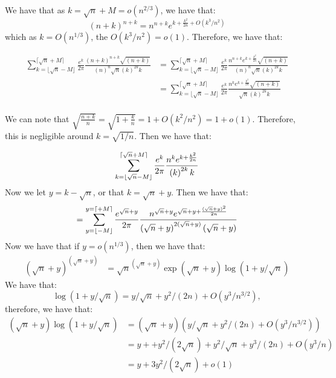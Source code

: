 \documentclass[]{article}
\begin{document}
We have that as $k = \sqrt{n} + M = o(n^{2/3})$, we have that:
\begin{equation}
	\left(n + k\right)^{n + k} = n^{n + k} e^{k + \frac{k^2}{2n} + O(k^3/n^2)}
\end{equation}
which as $k = O(n^{1/3})$, the $O(k^3/n^2) = o(1)$. Therefore, we have that:

\begin{align*}
	\sum_{k = \lfloor \sqrt{n} - M \rfloor }^{ \lceil \sqrt{n} + M \rceil} \frac{e^{k}}{2\pi} \frac{\left(n + k\right)^{n + k}\sqrt{(n + k)}}{\left(n\right)^n \sqrt{n} \left(k\right)^{2k}k } &= 
	\sum_{k = \lfloor \sqrt{n} - M \rfloor }^{ \lceil \sqrt{n} + M \rceil} \frac{e^{k}}{2\pi} \frac{n^{n + k} e^{k + \frac{k^2}{2n}}\sqrt{(n + k)}}{\left(n\right)^n \sqrt{n} \left(k\right)^{2k}k }\\
	&=
	\sum_{k = \lfloor \sqrt{n} - M \rfloor }^{ \lceil \sqrt{n} + M \rceil}
	\frac{e^{k}}{2\pi}
	\frac{n^{k} e^{k + \frac{k^2}{2n}}\sqrt{(n + k)}}
	{\sqrt{n} \left(k\right)^{2k}k }\\
\end{align*}


We can note that $\sqrt{\frac{n + k}{n}}= \sqrt{1 + \frac{k}{n}} = 1 + O(k^2/n^2) = 1 + o(1)$. Therefore, this is negligible around $k = \sqrt{1/n}$. Then we have that:

\begin{equation*}
	\sum_{k = \lfloor \sqrt{n} - M \rfloor }^{ \lceil \sqrt{n} + M \rceil}
	\frac{e^{k}}{2\pi}
	\frac{n^{k} e^{k + \frac{k^2}{2n}}}
	{ \left(k\right)^{2k}k }\\
\end{equation*}
Now we let $y = k - \sqrt{n}$, or that $k = \sqrt{n} + y$. Then we have that:
\begin{equation*}
	=
	\sum_{y = \lfloor -M \rfloor }^{y =  \lceil + M \rceil}
	\frac{e^{\sqrt{n} + y}}{2\pi}
	\frac{n^{\sqrt{n} + y} e^{\sqrt{n} + y + \frac{(\sqrt{n} + y)^2}{2n}}}
	{ \left(\sqrt{n} + y\right)^{2(\sqrt{n} + y)}(\sqrt{n} + y) }\\
\end{equation*}
Now we have that if $y = o(n^{1/3})$, then we have that:
\begin{align*}
	\left(\sqrt{n} + y\right)^{(\sqrt{n} + y)} &= \sqrt{n}^{(\sqrt{n} + y)} \exp(\sqrt{n} + y) \log(1 + y/\sqrt{n})
\end{align*}
We have that:
\begin{equation}
	\log(1 + y/\sqrt{n}) = y/\sqrt{n} + y^2/(2n) + O(y^3/n^{3/2}),
\end{equation}
therefore, we have that:
\begin{align*}
	(\sqrt{n} + y) \log(1 + y/\sqrt{n}) &= (\sqrt{n} + y) ( y/\sqrt{n} + y^2/(2n) + O(y^3/n^{3/2}))\\
	&= y + + y^2/(2 \sqrt{n}) + y^2/\sqrt{n} + y^3/(2n) + O(y^3/n)\\
	&= y + 3y^2/(2\sqrt{n}) + o(1)
\end{align*}
\end{document}
